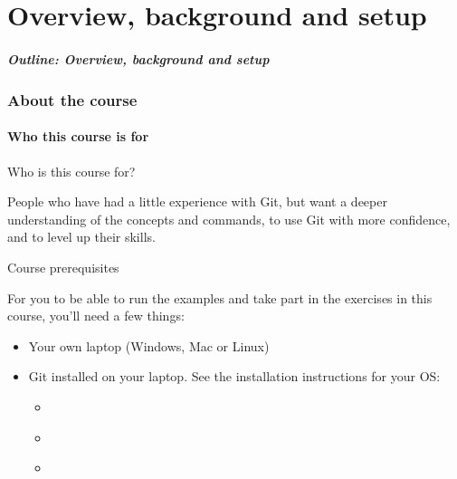 \part{Overview, background and setup}

\begin{frame}
    \partpage
\end{frame}

\begin{frame}
    \frametitle{Outline: Overview, background and setup}
    \tableofcontents[currentsection]
\end{frame}

\section{About the course}

\subsection{Who this course is for}

\begin{frame}{Who is this course for?}

    People who have had a little experience with Git, but want a deeper
    understanding of the concepts and commands, to use Git with more
    confidence, and to level up their skills.

\end{frame}

\begin{frame}{Course prerequisites}

For you to be able to run the examples and take part in the exercises in
this course, you'll need a few things:
    \begin{itemize}
        \item Your own laptop (Windows, Mac or Linux)
        \item Git installed on your laptop.  See the installation
            instructions for your OS:
            \begin{itemize}
                \item \hyperlink{installing_git_windows}{}
                \item \hyperlink{installing_git_mac}{}
                \item \hyperlink{installing_git_linux}{}
            \end{itemize}
    \end{itemize}
\end{frame}

